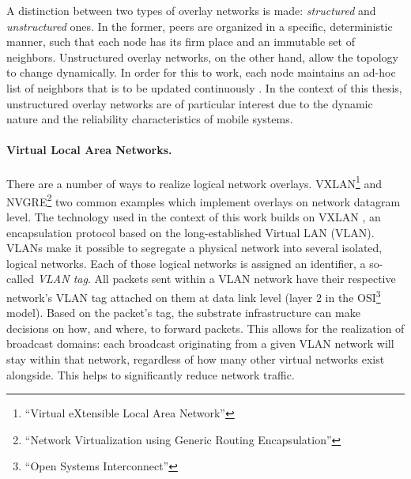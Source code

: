 A distinction between two types of overlay networks is made: \emph{structured} and \emph{unstructured} ones. In the former, peers are organized in a specific, deterministic manner, such that each node has its firm place and an immutable set of neighbors. Unstructured overlay networks, on the other hand, allow the topology to change dynamically. In order for this to work, each node maintains an ad-hoc list of neighbors that is to be updated continuously \cite{tanenbaum2017distributed}. In the context of this thesis, unstructured overlay networks are of particular interest due to the dynamic nature and the reliability characteristics of mobile systems. 

\paragraph{Virtual Local Area Networks.}
There are a number of ways to realize logical network overlays. VXLAN\footnote{``Virtual eXtensible Local Area Network''} and NVGRE\footnote{``Network Virtualization using Generic Routing Encapsulation''} two common examples which implement overlays on network datagram level. The technology used in the context of this work builds on VXLAN \cite{rfc7348}, an encapsulation protocol based on the long-established Virtual LAN (VLAN). VLANs make it possible to segregate a physical network into several isolated, logical networks. Each of those logical networks is assigned an identifier, a so-called \emph{VLAN tag}. All packets sent within a VLAN network have their respective network's VLAN tag attached on them at data link level (layer 2 in the OSI\footnote{``Open Systems Interconnect''} model). Based on the packet's tag, the substrate infrastructure can make decisions on how, and where, to forward packets. This allows for the realization of broadcast domains: each broadcast originating from a given VLAN network will stay within that network, regardless of how many other virtual networks exist alongside. This helps to significantly reduce network traffic.


